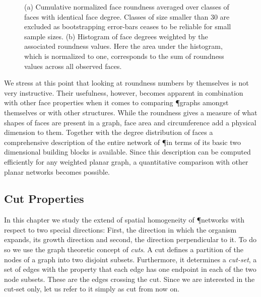 		\begin{figure}
			\centering
			\qquad

			\caption[Average face roundness per face type]{(a) Cumulative normalized face roundness averaged over classes of faces with identical face degree. Classes of size smaller than $30$ are excluded as bootstrapping error-bars ceases to be reliable for small sample sizes. (b) Histogram of face degrees weighted by the associated roundness values. Here the area under the histogram, which is normalized to one, corresponds to the sum of roundness values across all observed faces.}
		\end{figure}

		We stress at this point that looking at roundness numbers by themselves is not very instructive. Their usefulness, however, becomes apparent in combination with other face properties when it comes to comparing \P graphs amongst themselves or with other structures. While the roundness gives a measure of what shapes of faces are present in a graph, face area and circumference add a physical dimension to them. Together with the degree distribution of faces a comprehensive description of the entire network of \P in terms of its basic two dimensional building blocks is available. Since this description can be computed efficiently for any weighted planar graph, a quantitative comparison with other planar networks becomes possible.

	\subsection{Cut Properties}\label{sec:cut_properties}

		In this chapter we study the extend of spatial homogeneity of \P networks with respect to two special directions: First, the direction in which the organism expands, \ie its growth direction and second, the direction perpendicular to it. To do so we use the graph theoretic concept of \emph{cuts}. A cut defines a partition of the nodes of a graph into two disjoint subsets. Furthermore, it determines a \emph{cut-set}, a set of edges with the property that each edge has one endpoint in each of the two node subsets. These are the edges crossing the cut. Since we are interested in the cut-set only, let us refer to it simply as cut from now on. 

